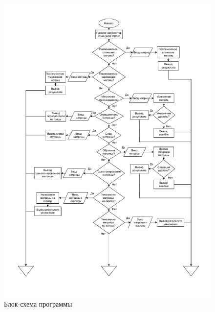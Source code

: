 \documentclass[a4paper,14pt]{extarticle}
\begin{document}
\begin{figure}[H]
	\includegraphics[page=2, width=\textwidth]{include/block_scheme.pdf}
	\caption{Блок-схема программы}
\end{figure}
\end{document}
